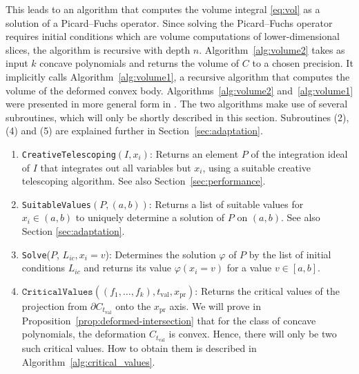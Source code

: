 \documentclass[sigconf, nonacm]{acmart} %
\newcommand{\pr}[0]{{\operatorname{pr}}}
\newcommand{\val}[0]{{\operatorname{val}}}
\begin{document}
This leads to an algorithm that computes the volume integral \eqref{eq:vol} as a solution of a Picard--Fuchs operator. Since solving the Picard--Fuchs operator requires initial conditions which are volume computations of lower-dimensional slices, the algorithm is recursive with depth $n$. Algorithm~\ref{alg:volume2} takes as input $k$ concave polynomials and returns the volume of $C$ to a chosen precision. It implicitly calls Algorithm~\ref{alg:volume1}, a recursive algorithm that computes the volume of the deformed convex body. Algorithms~\ref{alg:volume2} and~\ref{alg:volume1} were presented in more general form in \cite{Lairez_volumes_semi_algebraic_sets}.
The two algorithms make use of several subroutines, which will only be shortly described in this section. Subroutines (2), (4) and (5) are explained further in Section~\ref{sec:adaptation}.
\begin{enumerate}
    \item \texttt{CreativeTelescoping}$(I, x_i)$: Returns an element $P$ of the integration ideal of $I$ that integrates out all variables but $x_i$, using a suitable creative telescoping algorithm. See also Section~\ref{sec:performance}.
\end{enumerate}
\begin{enumerate}
    \setcounter{enumi}{1}
    \item \texttt{SuitableValues}$(P, (a,b))$: Returns a list of suitable values for $x_i \in (a,b)$ to uniquely determine a solution of $P$ on $(a,b)$. See also Section \ref{sec:adaptation}. 
\end{enumerate}
\begin{enumerate}
    \setcounter{enumi}{2}
    \item \texttt{Solve}($P$, $L_{ic},x_i = v$): Determines the solution $\varphi$ of $P$ by the list of initial conditions $L_{ic}$ and returns its value $\varphi(x_i = v)$ for a value $v \in [a,b]$.
\end{enumerate}
 \begin{enumerate}
    \setcounter{enumi}{3}
     \item $\texttt{CriticalValues}((f_1,\ldots, f_k), t_\val, x_{\pr})$: Returns the critical values of the projection from $\partial C_{t_\val}$ onto the $x_\pr$ axis. 
     We will prove in Proposition~\ref{prop:deformed-intersection} that for the class of concave polynomials, the deformation $C_{t_\val}$ is convex. Hence, there will only be two such critical values.
     How to obtain them is described in Algorithm~\ref{alg:critical_values}.
 \end{enumerate}
\end{document}
